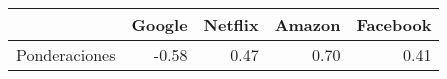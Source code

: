 \begin{table}[ht]
\centering
\begin{tabular}{rrrrr}
  \hline
 & Google & Netflix & Amazon & Facebook \\ 
  \hline
Ponderaciones & -0.58 & 0.47 & 0.70 & 0.41 \\ 
   \hline
\end{tabular}
\end{table}
